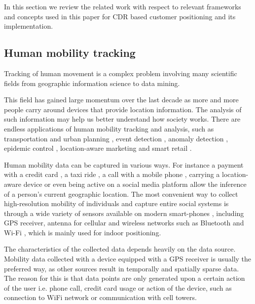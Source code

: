 In this section we review the related work with respect to relevant frameworks and concepts used in this paper for CDR based customer positioning and its implementation.

\subsection{Human mobility tracking}
Tracking of human movement is a complex problem involving many scientific fields from geographic information science to data mining. 

This field has gained large momentum over the last decade as more and more people carry around devices that provide location information. The analysis of such information may help us better understand how society works. There are endless applications of human mobility tracking and analysis, such as transportation and urban planning \cite{mobility-transport, mobility-transport2, mobility-urban}, event detection \cite{mobility-event, mobility-bluetooth}, anomaly detection \cite{mobility-anomaly}, epidemic control \cite{mobility-epidemic}, location-aware marketing \cite{mobility-marketing} and smart retail \cite{mobility-retail, mobility-retail2}.

Human mobility data can be captured in various ways. For instance a payment with a credit card \cite{mobility-card}, a taxi ride \cite{mobility-taxi, mobility-taxi2}, a call with a mobile phone \cite{mobility-cdr, mobility-cdr2, mobility-cdr3, mobility-cdr4}, carrying a location-aware device \cite{mobility-gps, mobility-wearable} or even being active on a social media platform \cite{mobility-twitter} allow the inference of a person's current geographic location. The most convenient way to collect high-resolution mobility of individuals and capture entire social systems is through a wide variety of sensors available on modern smart-phones \cite{mobility-phone}, including GPS receiver, antenna for cellular and wireless networks such as Bluetooth \cite{mobility-bluetooth} and Wi-Fi \cite{mobility-wifi}, which is mainly used for indoor positioning.  

The characteristics of the collected data depends heavily on the data source. Mobility data collected with a device equipped with a GPS receiver is usually the preferred way, as other sources result in temporally and spatially sparse data. The reason for this is that data points are only generated upon a certain action of the user i.e. phone call, credit card usage or action of the device, such as connection to WiFi network or communication with cell towers.

